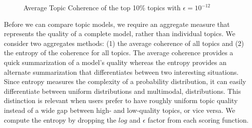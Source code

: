 \begin{figure}[h!t!b!]
  \centering
  \caption{Average Topic Coherence of the top 10\% topics with $\epsilon=10^{-12}$}
  \label{fig:10mean-smoothing}
\end{figure}

Before we can compare topic models, we require an aggregate
measure that represents the quality of a complete model, 
rather than individual topics.  We consider two aggregates methods:
(1) the average coherence of all topics and
(2) the entropy of the coherence for all topics.  
The average coherence provides a quick summarization of a model's quality
whereas the entropy provides an alternate summarization that differentiates
between two interesting situations.  Since entropy measures the complexity of a
probability distribution, it can easily differentiate between uniform
distributions and multimodal, distributions.  This distinction is relevant when
users prefer to have roughly uniform topic quality instead of a wide gap between
high- and low-quality topics, or vice versa.  We compute the entropy by dropping
the $log$  and $\epsilon$ factor from each scoring function.

